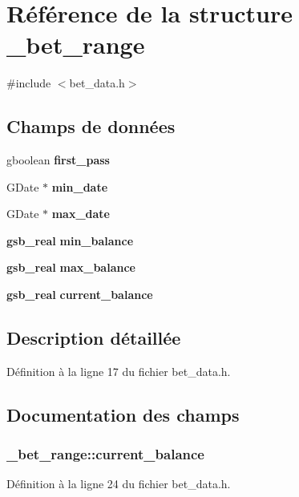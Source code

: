 \section{Référence de la structure \_\-bet\_\-range}
\label{struct__bet__range}


{\ttfamily \#include $<$bet\_\-data.h$>$}

\subsection*{Champs de données}
\begin{DoxyCompactItemize}
\item 
gboolean {\bf first\_\-pass}
\item 
GDate $\ast$ {\bf min\_\-date}
\item 
GDate $\ast$ {\bf max\_\-date}
\item 
{\bf gsb\_\-real} {\bf min\_\-balance}
\item 
{\bf gsb\_\-real} {\bf max\_\-balance}
\item 
{\bf gsb\_\-real} {\bf current\_\-balance}
\end{DoxyCompactItemize}


\subsection{Description détaillée}


Définition à la ligne 17 du fichier bet\_\-data.h.



\subsection{Documentation des champs}
\subsubsection[{current\_\-balance}]{ {\bf \_\-bet\_\-range::current\_\-balance}}\label{struct__bet__range_a23afd83173850a5001e7a5b36287b23f}


Définition à la ligne 24 du fichier bet\_\-data.h.

